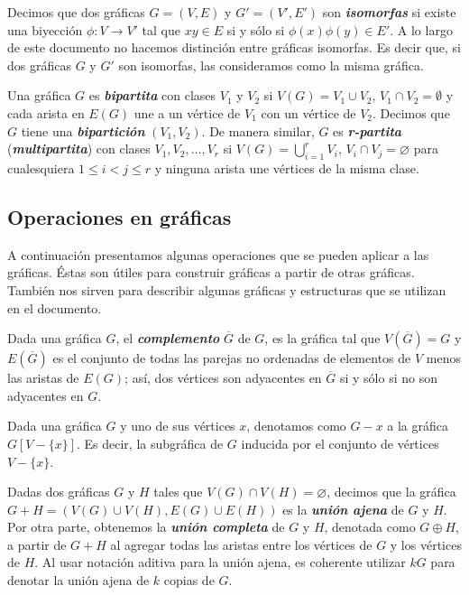 Decimos que dos gráficas $G=(V,E)$ y $G'=(V',E')$ son \textbf{\emph{isomorfas}} si existe una biyección $\phi:V\rightarrow V'$ tal que $xy\in E$ si y sólo si $\phi(x)\phi(y) \in E' $. A lo largo de este documento no hacemos distinción entre gráficas isomorfas. Es decir que, si dos gráficas $G$ y $G'$ son isomorfas, las consideramos como la misma gráfica.

Una gráfica $G$ es \textbf{\emph{bipartita}} con clases $V_1$ y $V_2$ si $V(G) = V_1 \cup V_2$, $V_1 \cap V_2 = \emptyset$ y cada arista en $E(G)$ une a un vértice de $V_1$ con un vértice de $V_2$. Decimos que $G$ tiene una \textbf{\emph{bipartición}} $(V_1,V_2)$. De manera similar, $G$ es \textbf{\emph{r-partita}} (\textbf{\emph{multipartita}}) con clases $V_1, V_2, \dots, V_r$ si $V(G) = \bigcup_{i=1}^r V_i$, $V_i \cap V_j = \varnothing$ para cualesquiera $1 \le i < j \le r$ y ninguna arista une vértices de la misma clase.



\subsection{Operaciones en gráficas}

A continuación presentamos algunas operaciones que se pueden aplicar a las gráficas. Éstas son útiles para construir gráficas a partir de otras gráficas. También nos sirven para describir algunas gráficas y estructuras que se utilizan en el documento.

Dada una gráfica $G$, el \textbf{\emph{complemento}} $\overline{G}$ de $G$, es la gráfica tal que $V(\overline{G}) = G$ y $E(\overline{G})$ es el conjunto de todas las parejas no ordenadas de elementos de $V$ menos las aristas de $E(G)$; así, dos vértices son adyacentes en $\overline{G}$ si y sólo si no son adyacentes en $G$.

 Dada una gráfica $G$ y uno de sus vértices $x$, denotamos como $G - x $ a la gráfica $G[V-\{x\}]$. Es decir, la subgráfica de $G$ inducida por el conjunto de vértices $V-\{x\}$.

Dadas dos gr\'aficas $G$ y $H$ tales que $V(G) \cap V(H) = \varnothing$, decimos que la gráfica $G + H = (V(G)\cup V(H), E(G)\cup E(H))$ es la \textbf{\emph{unión ajena}} de $G$ y $H$. Por otra parte, obtenemos la \textbf{\emph{unión completa}} de $G$ y $H$, denotada como $G \oplus H$, a partir de $G + H$ al agregar todas las aristas entre los vértices de $G$ y los vértices de $H$.   Al usar notaci\'on aditiva para la uni\'on ajena, es coherente utilizar $kG$ para denotar la uni\'on ajena de $k$ copias de $G$.


